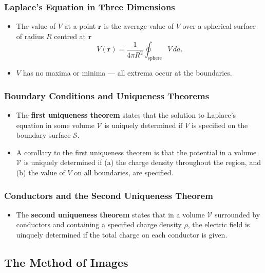 \documentclass{article}
\renewcommand{\vec}[1]{\boldsymbol{\mathbf{#1}}}
\begin{document}
\subsubsection{Laplace's Equation in Three Dimensions}

\begin{itemize}
  \item The value of $V$ at a point $\vec{r}$ is the average value of $V$ over a spherical surface of radius $R$ centred at $\vec{r}$ \[V(\vec{r}) = \frac{1}{4 \pi R^2} \oint_\text{sphere} V \,d a.\]

  \item $V$ has no maxima or minima — all extrema occur at the boundaries.
\end{itemize}

\subsubsection{Boundary Conditions and Uniqueness Theorems}

\begin{itemize}
  \item The \textbf{first uniqueness theorem} states that the solution to Laplace's equation in some volume $\mathcal{V}$ is uniquely determined if $V$ is specified on the boundary surface $\mathcal{S}$.

  \item A corollary to the first uniqueness theorem is that the potential in a volume $\mathcal{V}$ is uniquely determined if (a) the charge density throughout the region, and (b) the value of $V$ on all boundaries, are specified.
\end{itemize}

\subsubsection{Conductors and the Second Uniqueness Theorem}

\begin{itemize}
  \item The \textbf{second uniqueness theorem} states that in a volume $\mathcal{V}$ surrounded by conductors and containing a specified charge density $\rho$, the electric field is uinquely determined if the total charge on each conductor is given.
\end{itemize}

\subsection{The Method of Images}
\end{document}
